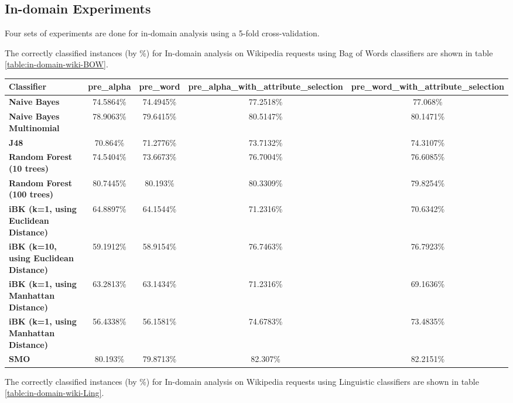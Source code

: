 \documentclass[conference]{IEEEtran}
\begin{document}
\subsection{In-domain Experiments}
Four sets of experiments are done for in-domain analysis using a 5-fold cross-validation. 

The correctly classified instances (by \%) for In-domain analysis on Wikipedia requests using Bag of Words classifiers are shown in table \ref{table:in-domain-wiki-BOW}.

\begin{table*}[htbp]
\caption{In-domain analysis on Wikipedia requests using Bag of Words classifiers }
\centering
\vspace{5pt}
\begin{tabular}{|l|c|c|c|c|}
\hline
\textbf{Classifier} & \textbf{pre\_alpha} & \textbf{pre\_word} & \textbf{pre\_alpha\_with\_attribute\_selection} & \textbf{pre\_word\_with\_attribute\_selection} \\
\hline\hline
\textbf{Naive Bayes} & 74.5864\% & 74.4945\% & 77.2518\% & 77.068\% \\ 
\hline
\textbf{Naive Bayes Multinomial} & 78.9063\% & 79.6415\% & 80.5147\% & 80.1471\% \\ 
\hline
\textbf{J48} & 70.864\% & 71.2776\% & 73.7132\% & 74.3107\% \\ 
\hline
\textbf{Random Forest (10 trees)} & 74.5404\% & 73.6673\% & 76.7004\% & 76.6085\% \\ 
\hline
\textbf{Random Forest (100 trees)} & 80.7445\% & 80.193\% & 80.3309\% & 79.8254\% \\ 
\hline
\textbf{iBK (k=1, using Euclidean Distance)} & 64.8897\% & 64.1544\% & 71.2316\% & 70.6342\% \\ 
\hline
\textbf{iBK (k=10, using Euclidean Distance)} & 59.1912\% & 58.9154\% & 76.7463\% & 76.7923\% \\ 
\hline
\textbf{iBK (k=1, using Manhattan Distance)} & 63.2813\% & 63.1434\% & 71.2316\% & 69.1636\% \\ 
\hline
\textbf{iBK (k=1, using Manhattan Distance)} & 56.4338\% & 56.1581\% & 74.6783\% & 73.4835\% \\ 
\hline
\textbf{SMO} & 80.193\% & 79.8713\% & 82.307\% & 82.2151\% \\ 
\hline
\hline
\end{tabular}
\label{table:in-domain-wiki-BOW}
\end{table*}

The correctly classified instances (by \%) for In-domain analysis on Wikipedia requests using Linguistic classifiers are shown in table \ref{table:in-domain-wiki-Ling}.
\end{document}
